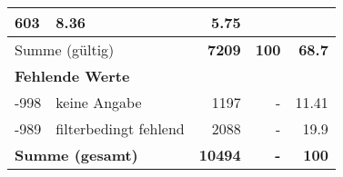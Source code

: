 \begin{longtable}{lXrrr}
       \num{603} &
       \num[round-mode=places,round-precision=2]{8.36} &
         \num[round-mode=places,round-precision=2]{5.75} \\
     \midrule
     \multicolumn{2}{l}{Summe (gültig)} &
       \textbf{\num{7209}} &
     \textbf{\num{100}} &
       \textbf{\num[round-mode=places,round-precision=2]{68.7}} \\
     \multicolumn{5}{l}{\textbf{Fehlende Werte}}\\
       -998 &
       keine Angabe &
         \num{1197} &
        - &
         \num[round-mode=places,round-precision=2]{11.41} \\
       -989 &
       filterbedingt fehlend &
         \num{2088} &
        - &
         \num[round-mode=places,round-precision=2]{19.9} \\
     \midrule
     \multicolumn{2}{l}{\textbf{Summe (gesamt)}} &
          \textbf{\num{10494}} &
        \textbf{-} &
        \textbf{\num{100}} \\
     \bottomrule
     \end{longtable}
     
